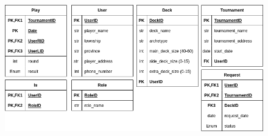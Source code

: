 \documentclass[a4paper]{article}
\begin{document}
\begin{figure}[h]
  \centering
  \includegraphics[width=1\textwidth]{table.png}
  \label{fig:etiqueta}
\end{figure}
\end{document}
